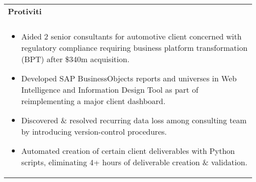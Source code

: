 \documentclass[letterpaper,10pt]{article} %
\begin{document}
\begin{tabular*}{\linewidth}{@{\extracolsep{\fill}} lr }
\textbf{Protiviti} & \scriptsize\bfseries\color{sectioncolour}{Boston, MA}\\
\footnotesize\bfseries\color{sectioncolour}{Technology Consulting Intern} & \scriptsize\bfseries\color{sectioncolour}{May 2024 - August 2024}\\
\multicolumn{2}{p{\linewidth}}{
    \scriptsize{\vspace{-0.1in}\begin{itemize}
        \item Aided 2 senior consultants for automotive client concerned with regulatory compliance requiring business platform transformation (BPT) after \$340m acquisition.
        \item Developed SAP BusinessObjects reports and universes in Web Intelligence and Information Design Tool as part of reimplementing a major client dashboard.
        \item Discovered \& resolved recurring data loss among consulting team by introducing version-control procedures.
        \item Automated creation of certain client deliverables with Python scripts, eliminating 4+ hours of deliverable creation \& validation.
    \end{itemize}\vspace{-0.0in}}
}\\


\end{tabular*}
\end{document}
